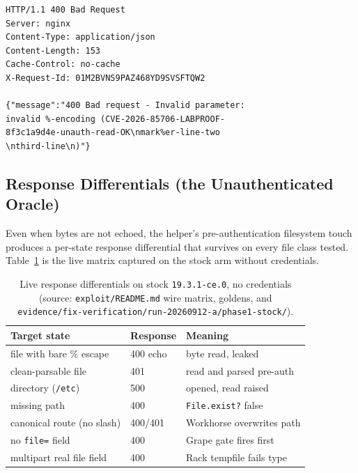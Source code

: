 \documentclass[journal]{IEEEtran}
\begin{document}
\begin{lstlisting}[style=wire, caption={Raw response bytes (truncated header
set) of the unauthenticated read of \texttt{/tmp/cve2026-85706-proof.txt} on
stock \texttt{19.3.1-ce.0}. The file content appears inside the 400 JSON
message, wrapped at column width. Same capture file as
Listing~\ref{lst:payload}.},
label={lst:wire}]
HTTP/1.1 400 Bad Request
Server: nginx
Content-Type: application/json
Content-Length: 153
Cache-Control: no-cache
X-Request-Id: 01M2BVNS9PAZ468YD9SVSFTQW2

{"message":"400 Bad request - Invalid parameter:
invalid %-encoding (CVE-2026-85706-LABPROOF-
8f3c1a9d4e-unauth-read-OK\nmark%er-line-two
\nthird-line\n)"}
\end{lstlisting}

\subsection{Response Differentials (the Unauthenticated Oracle)}

Even when bytes are not echoed, the helper's pre-authentication filesystem
touch produces a per-state response differential that survives on every file
class tested. Table~\ref{tab:oracle} is the live matrix captured on the stock
arm without credentials.

\begin{table}[t]
\caption{Live response differentials on stock \texttt{19.3.1-ce.0}, no
credentials (source: \texttt{exploit/README.md} wire matrix, goldens, and
\texttt{evidence/\hspace{0pt}fix-verification/\hspace{0pt}run-20260912-a/\hspace{0pt}phase1-stock/\hspace{0pt}}).}
\centering
\footnotesize
\begin{tabular}{p{2.62cm}p{1.55cm}p{1.68cm}}
\toprule
Target state & Response & Meaning \\
\midrule
file with bare \% escape & 400 echo & byte read, leaked \\
clean-parsable file & 401 & read and parsed pre-auth \\
directory (\texttt{/etc}) & 500 & opened, read raised \\
missing path & 400 & \texttt{File.exist\hspace{0pt}?} false \\
canonical route (no slash) & 400/401 & Workhorse overwrites path \\
no \texttt{file=} field & 400 & Grape gate fires first \\
multipart real file field & 400 & Rack tempfile fails type \\
\bottomrule
\end{tabular}
\label{tab:oracle}
\end{table}
\end{document}
